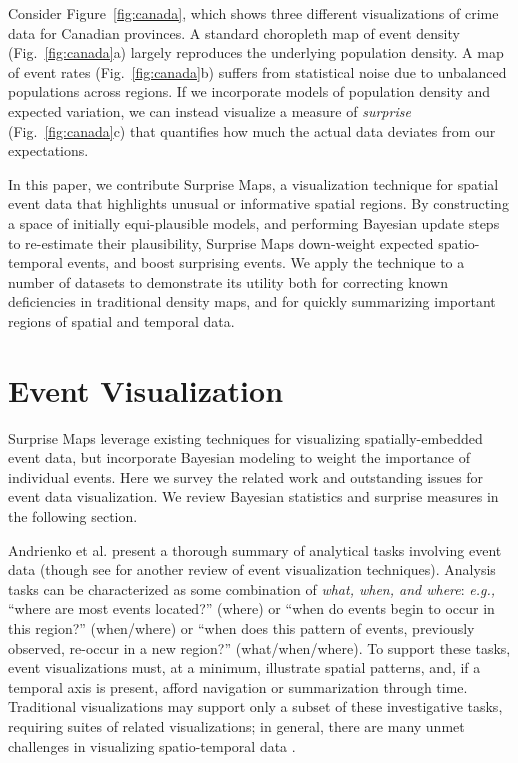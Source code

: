 \documentclass[journal]{vgtc}                %
\begin{document}
Consider Figure~\ref{fig:canada}, which shows three different visualizations of crime data for Canadian provinces. A standard choropleth map of event density (Fig.~\ref{fig:canada}a) largely reproduces the underlying population density. A map of event rates (Fig.~\ref{fig:canada}b) suffers from statistical noise due to unbalanced populations across regions. If we incorporate models of population density and expected variation, we can instead visualize a measure of \emph{surprise} (Fig.~\ref{fig:canada}c) that quantifies how much the actual data deviates from our expectations.

In this paper, we contribute Surprise Maps, a visualization technique for spatial event data that highlights unusual or informative spatial regions. By constructing a space of initially equi-plausible models, and performing Bayesian update steps to re-estimate their plausibility, Surprise Maps down-weight expected spatio-temporal events, and boost surprising events. We apply the technique to a number of datasets to demonstrate its utility both for correcting known deficiencies in traditional density maps, and for quickly summarizing important regions of spatial and temporal data.

\section{Event Visualization}

Surprise Maps leverage existing techniques for visualizing spatially-embedded event data, but incorporate Bayesian modeling to weight the importance of individual events. Here we survey the related work and outstanding issues for event data visualization. We review Bayesian statistics and surprise measures in the following section.

Andrienko et al. \cite{andrienko2003exploratory} present a thorough summary of analytical tasks involving event data (though see \cite{muller2003visualization} for another review of event visualization techniques). Analysis tasks can be characterized as some combination of \emph{what, when, and where}: \emph{e.g.,} ``where are most events located?'' (where) or ``when do events begin to occur in this region?'' (when/where) or ``when does this pattern of events, previously observed, re-occur in a new region?'' (what/when/where). To support these tasks, event visualizations must, at a minimum, illustrate spatial patterns, and, if a temporal axis is present, afford navigation or summarization through time. Traditional visualizations may support only a subset of these investigative tasks, requiring suites of related visualizations; in general, there are many unmet challenges in visualizing spatio-temporal data \cite{dykes2003seeking}.
\end{document}
